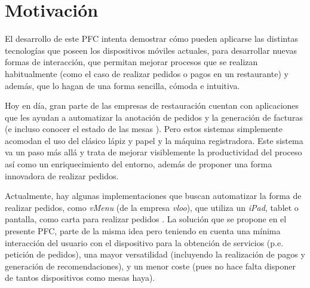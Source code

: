 \section{Motivación}
El desarrollo de este PFC intenta demostrar cómo pueden aplicarse las
distintas tecnologías que poseen los dispositivos móviles actuales, para
desarrollar nuevas formas de interacción, que permitan mejorar procesos
que se realizan habitualmente (como el caso de realizar pedidos o pagos en un
restaurante) y además, que lo hagan de una forma sencilla, cómoda e intuitiva.

Hoy en día, gran parte de las empresas de restauración cuentan con aplicaciones
que les ayudan a automatizar la anotación de pedidos y la generación de
facturas (e incluso conocer el estado de las mesas \cite{bib:DHC}). Pero estos
sistemas simplemente acomodan el uso del clásico lápiz y papel y la máquina
registradora. Este sistema va un paso más allá y trata de mejorar visiblemente
la productividad del proceso así como un enriquecimiento del entorno, además
de proponer una forma innovadora de realizar pedidos.

Actualmente, hay algunas implementaciones que buscan automatizar la forma
de realizar pedidos, como \emph{vMenu} (de la empresa \emph{vloo}), que
utiliza un \emph{iPad}, tablet o pantalla, como carta para realizar pedidos 
\cite{bib:vMenu}. La solución que se propone en el presente PFC, parte de la
misma idea pero teniendo en cuenta una mínima interacción del usuario con el 
dispositivo para la obtención de servicios (p.e. petición de pedidos), una 
mayor versatilidad (incluyendo la realización de pagos\cite{bib:Pay} y 
generación de recomendaciones), y un menor coste (pues no hace falta disponer 
de tantos dispositivos como mesas haya).


